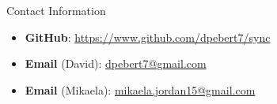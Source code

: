 \documentclass[final, xcolor=dvipsnames]{beamer}
\newlength{\onecolwid}
\begin{document}
\begin{frame}[t]
\begin{columns}[t]
\begin{column}{\onecolwid}
\begin{alertblock}{Contact Information}

\begin{itemize}
\item \textbf{GitHub}: \href{https://www.github.com/dpebert7/sync}{https://www.github.com/dpebert7/sync}
\item \textbf{Email} (David): \href{mailto:dpebert7@gmail.com}{dpebert7@gmail.com}
\item \textbf{Email} (Mikaela): \href{mailto:mikaela.jordan15@gmail.com}{mikaela.jordan15@gmail.com}
\end{itemize}

\end{alertblock}

\begin{center}
\begin{tabular}{ccc}
\end{tabular}
\end{center}


\end{column} %

\end{columns} %

\end{frame} %
\end{document}
